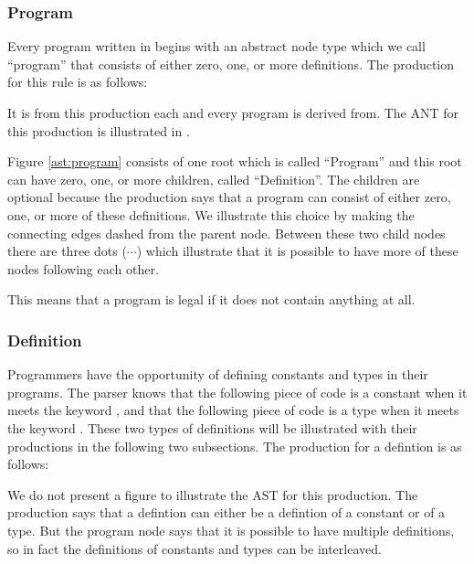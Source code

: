 \subsubsection{Program}
Every program written in \productname{} begins with an abstract node type which 
we call ``program'' that consists of either zero, one, or more definitions. The 
production for this rule is as follows:

\begin{ebnf}
\end{ebnf}

It is from this production each and every program is derived from. The ANT for 
this production is illustrated in .



Figure \ref{ast:program} consists of one root which is called ``Program'' and
this root can have zero, one, or more children, called ``Definition''. The
children are optional because the production says that a program can consist of
either zero, one, or more of these definitions. We illustrate this choice by
making the connecting edges dashed from the parent node. Between these two child
nodes there are three dots ($\cdots$) which illustrate that it is possible to
have more of these nodes following each other.

This means that a program is legal if it does not contain anything at all.

\subsubsection{Definition}
Programmers have the opportunity of defining constants and types in their
programs.  The parser knows that the following piece of code is a constant when
it meets the keyword , and that the following piece of code is a
type when it meets the keyword . These two types of definitions will
be illustrated with their productions in the following two subsections. The 
production for a defintion is as follows:

\begin{ebnf}
\end{ebnf}

We do not present a figure to illustrate the AST for this production. The
production says that a defintion can either be a defintion of a constant or of a
type. But the program node says that it is possible to have multiple
definitions, so in fact the definitions of constants and types can be
interleaved.

